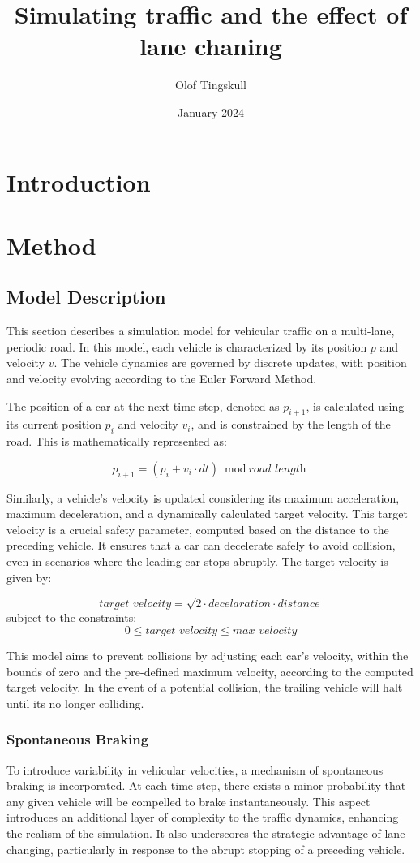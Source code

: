 \documentclass{article}
\title{Simulating traffic and the effect of lane chaning}
\author{Olof Tingskull}
\date{January 2024}
\begin{document}
\maketitle

\section{Introduction}

\section{Method}

\subsection{Model Description}
This section describes a simulation model for vehicular traffic on a multi-lane, periodic road. In this model, each vehicle is characterized by its position $p$ and velocity $v$. The vehicle dynamics are governed by discrete updates, with position and velocity evolving according to the Euler Forward Method.

The position of a car at the next time step, denoted as $p_{i+1}$, is calculated using its current position $p_i$ and velocity $v_i$, and is constrained by the length of the road. This is mathematically represented as:

$$p_{i+1} = (p_i + v_i \cdot dt) \bmod \textit{road length}$$ 

Similarly, a vehicle’s velocity is updated considering its maximum acceleration, maximum deceleration, and a dynamically calculated target velocity. This target velocity is a crucial safety parameter, computed based on the distance to the preceding vehicle. It ensures that a car can decelerate safely to avoid collision, even in scenarios where the leading car stops abruptly. The target velocity is given by:

$$\textit{target velocity} = \sqrt{2 \cdot decelaration \cdot distance}  $$
subject to the constraints:
$$ 0 \leq \textit{target velocity} \leq \textit{max velocity}$$

This model aims to prevent collisions by adjusting each car's velocity, within the bounds of zero and the pre-defined maximum velocity, according to the computed target velocity. In the event of a potential collision, the trailing vehicle will halt until its no longer colliding.

\subsubsection{Spontaneous Braking}
To introduce variability in vehicular velocities, a mechanism of spontaneous braking is incorporated. At each time step, there exists a minor probability that any given vehicle will be compelled to brake instantaneously. This aspect introduces an additional layer of complexity to the traffic dynamics, enhancing the realism of the simulation. It also underscores the strategic advantage of lane changing, particularly in response to the abrupt stopping of a preceding vehicle.
\end{document}

